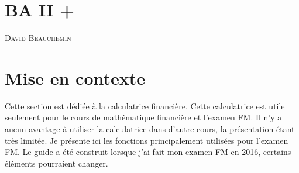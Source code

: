 \documentclass[french]{article}
\makeatletter
\newcommand{\chapterauthor}[1]{%
  {\parindent0pt\vspace*{-15pt}%
  \linespread{1.1}\large\scshape#1%
  \par\nobreak\vspace*{35pt}}
  \@afterheading%
}
\makeatother
\begin{document}



\newpage
\section{BA II +}
\chapterauthor{David Beauchemin}

\section*{Mise en contexte}
Cette section est dédiée à la calculatrice financière. Cette calculatrice est utile seulement pour le cours de mathématique financière et l'examen FM. Il n'y a aucun avantage à utiliser la calculatrice dans d'autre cours, la présentation étant très limitée. Je présente ici les fonctions principalement utilisées pour l'examen FM. Le guide a été construit lorsque j'ai fait mon examen FM en 2016, certains éléments pourraient changer.

\end{document}
